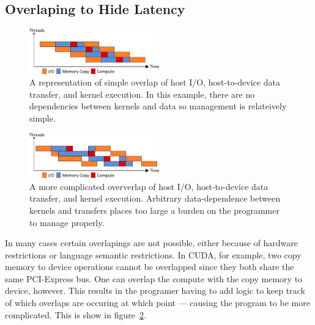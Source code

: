 \subsection{Overlaping to Hide Latency}



\begin{figure}
  \centering
    \includegraphics[width=0.5\textwidth]{fig/ord.png}
  \caption{A representation of simple overlap of host I/O, host-to-device data
           transfer, and kernel execution. In this example, there are no
           dependencies between kernels and data so management is relateively
           simple.}
  \label{fig:unord}
\end{figure}

\begin{figure}
  \centering
    \includegraphics[width=0.5\textwidth]{fig/unord.png}
  \caption{A more complicated oververlap of host I/O, host-to-device data
           transfer, and kernel execution. Arbitrary data-dependence between
           kernels and transfers places too large a burden on the programmer
           to manage properly.}
  \label{fig:unord}
\end{figure}

In many cases certain overlapings are not possible, either because of
  hardware restrictions or language semantic restrictions.
In CUDA, for example, two copy memory to device operations cannot be
overlapped since they both share the same PCI-Express bus.
One can overlap the compute with the copy memory to device, however.
This results in the programer having to add logic to keep track of which
  overlaps are occuring at which point --- causing the program to be
  more complicated.
This is show in figure~\ref{fig:unord}.

 

